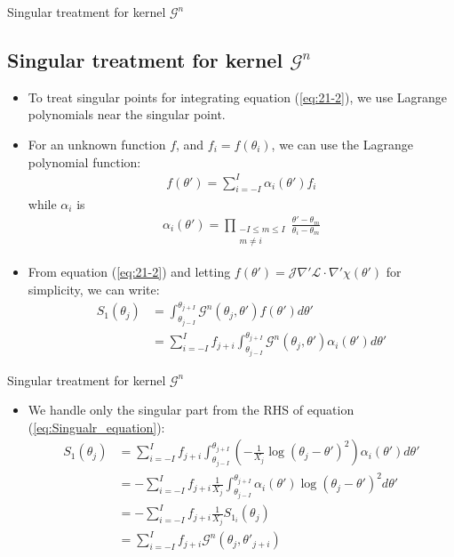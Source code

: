 \documentclass[8pt]{beamer}
\begin{document}
\begin{frame}{\color{white} Singular treatment for kernel $\mathcal{G}^n$}
\subsection{Singular treatment for kernel $\mathcal{G}^n$ }
\begin{itemize}
    \item To treat singular points for integrating equation (\ref{eq:21-2}), we use Lagrange polynomials near the singular point.
    \item For an unknown function $f$, and $f_i=f(\theta_i)$, we can use the Lagrange polynomial function:
    \begin{align}
         f(\theta') = \sum^{I}_{i=-I} \alpha_i(\theta')f_i
    \end{align}
    while $\alpha_i$ is
    \begin{align}
         \alpha_i(\theta') = \prod_{\substack{-I \le m \le I \\ m \ne i}} \frac{\theta' - \theta_m}{\theta_i - \theta_m} \label{eq:alpha}
    \end{align}
    \item From equation (\ref{eq:21-2}) and letting $f(\theta') = \mathcal{J} \nabla'\mathcal{L}\cdot\nabla'\chi(\theta')$ for simplicity, we can write:
    \begin{align}
         S_1(\theta_j) &= \int^{\theta_{j+I}}_{\theta_{j-I}} \mathcal{G}^n(\theta_j,\theta')f(\theta')d\theta'\\
         &= \sum_{i=-I}^{I} f_{j+i} \int^{\theta_{j+I}}_{\theta_{j-I}} \mathcal{G}^n(\theta_j,\theta')\alpha_i(\theta') d\theta'
    \end{align}

\end{itemize}
\end{frame}

\begin{frame}{\color{white} Singular treatment for kernel $\mathcal{G}^n$}
\begin{itemize}
    \item We handle only the singular part from the RHS of equation (\ref{eq:Singualr_equation}):
    \begin{align}
         S_1(\theta_j) 
         &=\sum_{i=-I}^{I} f_{j+i} \int^{\theta_{j+I}}_{\theta_{j-I}} \left( -\frac{1}{X_j}\log(\theta_j-\theta')^2\right)\alpha_i(\theta') d\theta' \\
         &= -\sum_{i=-I}^{I} f_{j+i} \frac{1}{X_j}\int^{\theta_{j+I}}_{\theta_{j-I}} \alpha_i(\theta') \log(\theta_j-\theta')^2 d\theta'\\
         &= -\sum_{i=-I}^{I} f_{j+i} \frac{1}{X_j}S_{1_i}(\theta_j) \label{eq:S1} \\
         &= \sum_{i=-I}^{I} f_{j+i} \mathcal{G}^n (\theta_j, \theta'_{j+i})
    \end{align}

\end{itemize}
\end{frame}
\end{document}

